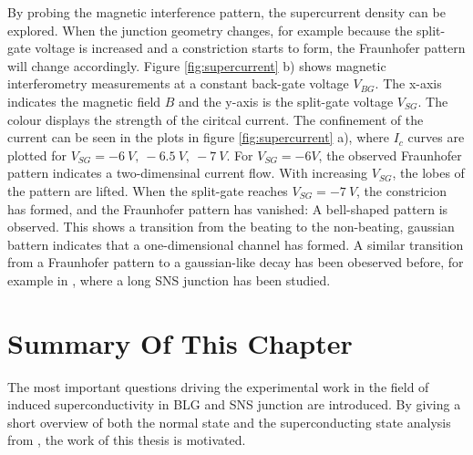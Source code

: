 By probing the magnetic interference pattern, the supercurrent density can be explored. When the junction geometry changes, for example because the split-gate voltage is increased and a constriction starts to form, the Fraunhofer pattern will change accordingly. Figure \ref{fig:supercurrent} b) shows magnetic interferometry measurements at a constant back-gate voltage $V_{BG}$. The x-axis indicates the magnetic field $B$ and the y-axis is the split-gate voltage $V_{SG}$. The colour displays the strength of the ciritcal current. The confinement of the current can be seen in the plots in figure \ref{fig:supercurrent} a), where $I_c$ curves are plotted for $V_{SG} = -6\ V,\ -6.5\ V,\ -7\ V$. For $V_{SG} = -6 V$, the observed Fraunhofer pattern indicates a two-dimensinal current flow. With increasing $V_{SG}$, the lobes of the pattern are lifted. When the split-gate reaches $V_{SG} = -7\ V$, the constricion has formed, and the Fraunhofer pattern has vanished: A bell-shaped pattern is observed. This shows a transition from the beating to the non-beating, gaussian battern indicates that a one-dimensional channel has formed. A similar transition from a Fraunhofer pattern to a gaussian-like decay has been obeserved before, for example in \cite{Chiodi2012}, where a long SNS junction has been studied.

\section{Summary Of This Chapter}
The most important questions driving the experimental work in the field of induced superconductivity in BLG and SNS junction are introduced. By giving a short overview of both the normal state and the superconducting state analysis from \cite{Kraft2017}, the work of this thesis is motivated.